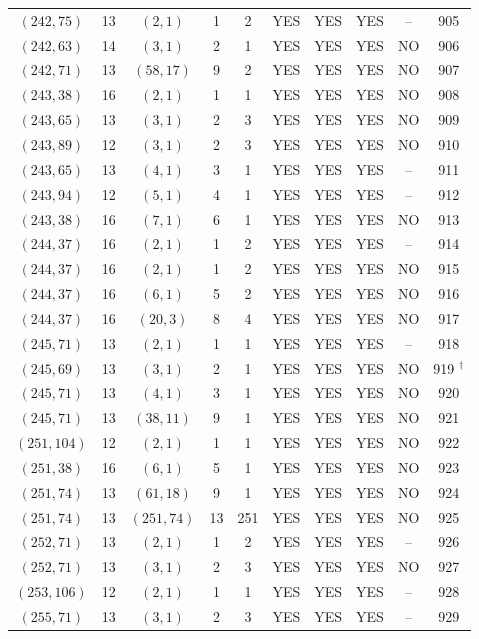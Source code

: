 \begin{longtable}{|c|c|c|c|c|c|c|c|c|c|}
$(242, 75)$ & 13 & $(2, 1)$ & 1 & 2 & YES & YES & YES & -- & 905\\
$(242, 63)$ & 14 & $(3, 1)$ & 2 & 1 & YES & YES & YES & NO & 906\\
$(242, 71)$ & 13 & $(58, 17)$ & 9 & 2 & YES & YES & YES & NO & 907\\
$(243, 38)$ & 16 & $(2, 1)$ & 1 & 1 & YES & YES & YES & NO & 908\\
$(243, 65)$ & 13 & $(3, 1)$ & 2 & 3 & YES & YES & YES & NO & 909\\
$(243, 89)$ & 12 & $(3, 1)$ & 2 & 3 & YES & YES & YES & NO & 910\\
$(243, 65)$ & 13 & $(4, 1)$ & 3 & 1 & YES & YES & YES & -- & 911\\
$(243, 94)$ & 12 & $(5, 1)$ & 4 & 1 & YES & YES & YES & -- & 912\\
$(243, 38)$ & 16 & $(7, 1)$ & 6 & 1 & YES & YES & YES & NO & 913\\
$(244, 37)$ & 16 & $(2, 1)$ & 1 & 2 & YES & YES & YES & -- & 914\\
$(244, 37)$ & 16 & $(2, 1)$ & 1 & 2 & YES & YES & YES & NO & 915\\
$(244, 37)$ & 16 & $(6, 1)$ & 5 & 2 & YES & YES & YES & NO & 916\\
$(244, 37)$ & 16 & $(20, 3)$ & 8 & 4 & YES & YES & YES & NO & 917\\
$(245, 71)$ & 13 & $(2, 1)$ & 1 & 1 & YES & YES & YES & -- & 918\\
$(245, 69)$ & 13 & $(3, 1)$ & 2 & 1 & YES & YES & YES & NO & 919 ${}^\dagger$\\
$(245, 71)$ & 13 & $(4, 1)$ & 3 & 1 & YES & YES & YES & NO & 920\\
$(245, 71)$ & 13 & $(38, 11)$ & 9 & 1 & YES & YES & YES & NO & 921\\
$(251, 104)$ & 12 & $(2, 1)$ & 1 & 1 & YES & YES & YES & NO & 922\\
$(251, 38)$ & 16 & $(6, 1)$ & 5 & 1 & YES & YES & YES & NO & 923\\
$(251, 74)$ & 13 & $(61, 18)$ & 9 & 1 & YES & YES & YES & NO & 924\\
$(251, 74)$ & 13 & $(251, 74)$ & 13 & 251 & YES & YES & YES & NO & 925\\
$(252, 71)$ & 13 & $(2, 1)$ & 1 & 2 & YES & YES & YES & -- & 926\\
$(252, 71)$ & 13 & $(3, 1)$ & 2 & 3 & YES & YES & YES & NO & 927\\
$(253, 106)$ & 12 & $(2, 1)$ & 1 & 1 & YES & YES & YES & -- & 928\\
$(255, 71)$ & 13 & $(3, 1)$ & 2 & 3 & YES & YES & YES & -- & 929\\

\end{longtable}
